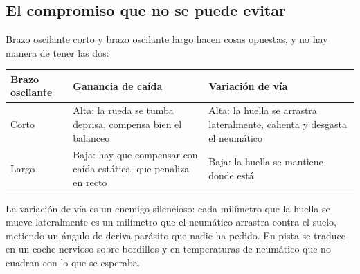 \subsection{El compromiso que no se puede evitar}

Brazo oscilante corto y brazo oscilante largo hacen cosas opuestas, y no hay
manera de tener las dos:

\begin{center}
\begin{tabularx}{\textwidth}{@{}lXX@{}}
\toprule
\textbf{Brazo oscilante} & \textbf{Ganancia de caída} & \textbf{Variación de vía} \\
\midrule
Corto & Alta: la rueda se tumba deprisa, compensa bien el balanceo &
  Alta: la huella se arrastra lateralmente, calienta y desgasta el neumático \\
Largo & Baja: hay que compensar con caída estática, que penaliza en recto &
  Baja: la huella se mantiene donde está \\
\bottomrule
\end{tabularx}
\end{center}

La variación de vía es un enemigo silencioso: cada milímetro que la huella se
mueve lateralmente es un milímetro que el neumático arrastra contra el suelo,
metiendo un ángulo de deriva parásito que nadie ha pedido. En pista se traduce
en un coche nervioso sobre bordillos y en temperaturas de neumático que no
cuadran con lo que se esperaba.

